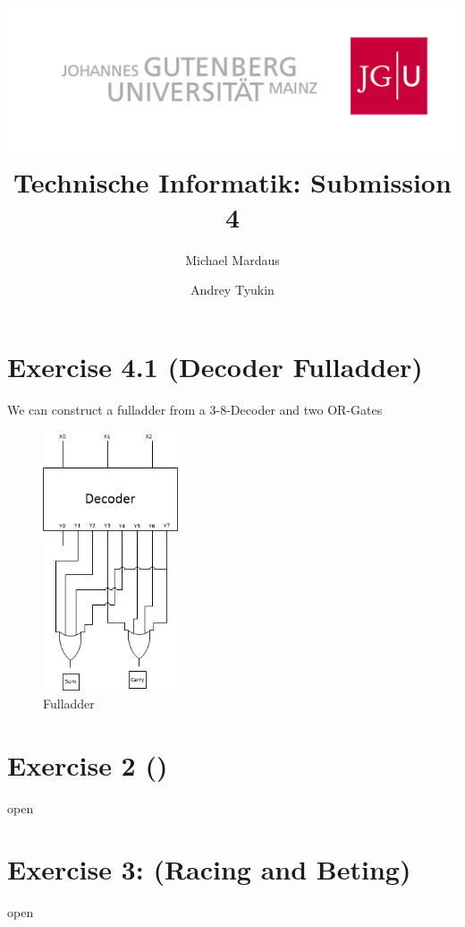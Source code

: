 \documentclass[10pt,a4paper]{scrartcl}
\author{Michael Mardaus \and Andrey Tyukin}
\title{\includegraphics[scale=0.2]{../logo_schriftzug}\\
Technische Informatik: Submission 4}
\begin{document}
\maketitle

\section*{Exercise 4.1 (Decoder Fulladder)}

We can construct a fulladder from a 3-8-Decoder and 
two OR-Gates

\vspace{1em}
\begin{figure}[h]
  \centering\includegraphics[width=4cm]{images/fulladder.png}
  \caption{Fulladder}
\end{figure}
\vspace{1em}

\FloatBarrier
\section*{Exercise 2 ()}
open

\section*{Exercise 3: (Racing and Beting)}
open
\end{document}
